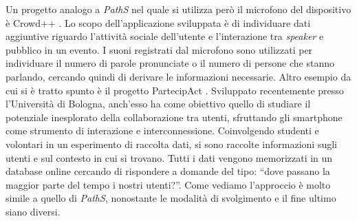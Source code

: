Un progetto analogo a \emph{PathS} nel quale si utilizza però il microfono del dispositivo è Crowd++ \cite{crowdplusplus}. Lo scopo dell'applicazione sviluppata è di individuare dati aggiuntive riguardo l'attività sociale dell'utente e l'interazione tra \emph{speaker} e pubblico in un evento. I suoni registrati dal microfono sono utilizzati per individuare il numero di parole pronunciate o il numero di persone che stanno parlando, cercando quindi di derivare le informazioni necessarie.
Altro esempio da cui si è tratto spunto è il progetto PartecipAct \cite{participact}. Sviluppato recentemente presso l'Università di Bologna, anch'esso ha come obiettivo quello di studiare il potenziale inesplorato della collaborazione tra utenti, sfruttando gli smartphone come strumento di interazione e interconnessione. Coinvolgendo studenti e volontari in un esperimento di raccolta dati, si sono raccolte informazioni sugli utenti e sul contesto in cui si trovano. Tutti i dati vengono memorizzati in un database online cercando di rispondere a domande del tipo: ``dove passano la maggior parte del tempo i nostri utenti?''. Come vediamo l'approccio è molto simile a quello di \emph{PathS}, nonostante le modalità di svolgimento e il fine ultimo siano diversi.
